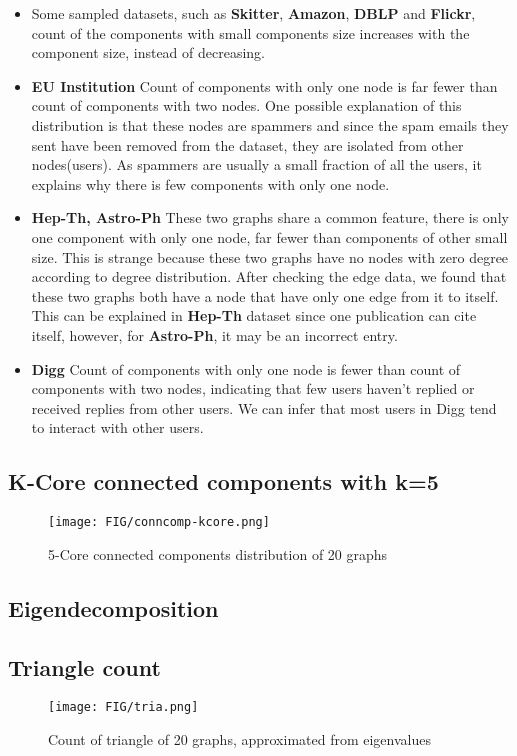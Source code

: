 \begin{itemize}
\item Some sampled datasets, such as \textbf{Skitter}, \textbf{Amazon}, \textbf{DBLP} and \textbf{Flickr}, count of the components with small components size increases with the component size, instead of decreasing.
\item \textbf{EU Institution} Count of components with only one node is far fewer than count of components with two nodes. One possible explanation of this distribution is that these nodes are spammers and since the spam emails they sent have been removed from the dataset, they are isolated from other nodes(users). As spammers are usually a small fraction of all the users, it explains why there is few components with only one node.
\item \textbf{Hep-Th, Astro-Ph} These two graphs share a common feature, there is only one component with only one node, far fewer than components of other small size. This is strange because these two graphs have no nodes with zero degree according to degree distribution. After checking the edge data, we found that these two graphs both have a node that have only one edge from it to itself. This can be explained in \textbf{Hep-Th} dataset since one publication can cite itself, however, for \textbf{Astro-Ph}, it may be an incorrect entry.
\item \textbf{Digg} Count of components with only one node is fewer than count of components with two nodes, indicating that few users haven't replied or received replies from other users. We can infer that most users in Digg tend to interact with other users.
\end{itemize}

\subsection{K-Core connected components with k=5}
\begin{figure}[H]
\begin{center}
\texttt{[image: FIG/conncomp-kcore.png]}
\caption{5-Core connected components distribution of 20 graphs}
\end{center}
\end{figure}

\subsection{Eigendecomposition}
\subsection{Triangle count}
\begin{figure}[H]
\begin{center}
\texttt{[image: FIG/tria.png]}
\caption{Count of triangle of 20 graphs, approximated from eigenvalues}
\end{center}
\end{figure}